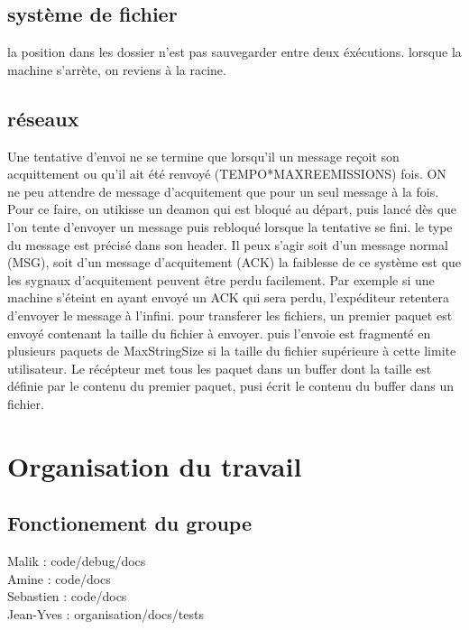 \documentclass{article}
\begin{document}
	\subsection{système de fichier}
la position dans les dossier n'est pas sauvegarder entre deux éxécutions.
lorsque la machine s'arrète, on reviens à la racine.

	\subsection{réseaux}
		Une tentative d'envoi ne se termine que lorsqu'il un message reçoit son acquittement ou qu'il ait été renvoyé (TEMPO*MAXREEMISSIONS) fois. ON ne peu attendre de message d'acquitement que pour un seul message à la fois. Pour ce faire, on utikisse un deamon qui est bloqué au départ, puis lancé dès que l'on tente d'envoyer un message puis rebloqué lorsque la tentative se fini.
		le type du message est précisé dans son header. Il peux s'agir soit d'un message normal (MSG), soit d'un message d'acquitement (ACK)
		la faiblesse de ce système est que les sygnaux d'acquitement peuvent être perdu facilement. Par exemple si une machine s'éteint en ayant envoyé un ACK qui sera perdu, l'expéditeur retentera d'envoyer le message à l'infini.
		pour transferer les fichiers, un premier paquet est envoyé contenant la taille du fichier à envoyer. puis l'envoie est fragmenté en plusieurs paquets de MaxStringSize si la taille du fichier supérieure à cette limite utilisateur. Le récépteur met tous les paquet dans un buffer dont la taille est définie par le contenu du premier paquet, pusi écrit le contenu du buffer dans un fichier.
		

\section{Organisation du travail}
	\subsection{Fonctionement du groupe}
		Malik : code/debug/docs\\
		Amine : code/docs\\
		Sebastien : code/docs\\
		Jean-Yves : organisation/docs/tests\\
\end{document}
